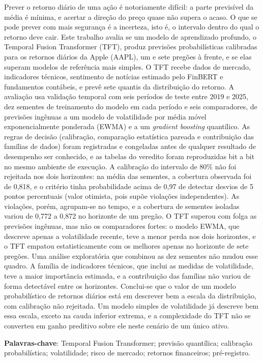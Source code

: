 \begin{resumo}

Prever o retorno diário de uma ação é notoriamente difícil: a parte previsível da média é mínima, e acertar a direção do preço quase não supera o acaso. O que se pode prever com mais segurança é a incerteza, isto é, o intervalo dentro do qual o retorno deve cair. Este trabalho avalia se um modelo de aprendizado profundo, o Temporal Fusion Transformer (TFT), produz previsões probabilísticas calibradas para os retornos diários da Apple (AAPL), um e sete pregões à frente, e se elas superam modelos de referência mais simples. O TFT recebe dados de mercado, indicadores técnicos, sentimento de notícias estimado pelo FinBERT e fundamentos contábeis, e prevê sete quantis da distribuição do retorno. A avaliação usa validação temporal com seis períodos de teste entre 2019 e 2025, dez sementes de treinamento do modelo em cada período e seis comparadores, de previsões ingênuas a um modelo de volatilidade por média móvel exponencialmente ponderada (EWMA) e a um \textit{gradient boosting} quantílico. As regras de decisão (calibração, comparação estatística pareada e contribuição das famílias de dados) foram registradas e congeladas antes de qualquer resultado de desempenho ser conhecido, e as tabelas do veredito foram reproduzidas bit a bit no mesmo ambiente de execução. A calibração do intervalo de 80\% não foi rejeitada nos dois horizontes: na média das sementes, a cobertura observada foi de 0,818, e o critério tinha probabilidade acima de 0,97 de detectar desvios de 5 pontos percentuais (valor otimista, pois supõe violações independentes). As violações, porém, agrupam-se no tempo, e a cobertura de sementes isoladas variou de 0,772 a 0,872 no horizonte de um pregão. O TFT superou com folga as previsões ingênuas, mas não os comparadores fortes: o modelo EWMA, que descreve apenas a volatilidade recente, teve a menor perda nos dois horizontes, e o TFT empatou estatisticamente com os melhores apenas no horizonte de sete pregões. Uma análise exploratória que combinou as dez sementes não mudou esse quadro. A família de indicadores técnicos, que inclui as medidas de volatilidade, teve a maior importância estimada, e a contribuição das famílias não variou de forma detectável entre os horizontes. Conclui-se que o valor de um modelo probabilístico de retornos diários está em descrever bem a escala da distribuição, com calibração não rejeitada. Um modelo simples de volatilidade já descreve bem essa escala, exceto na cauda inferior extrema, e a complexidade do TFT não se converteu em ganho preditivo sobre ele neste cenário de um único ativo.

\textbf{Palavras-chave}: Temporal Fusion Transformer; previsão quantílica; calibração probabilística; volatilidade; risco de mercado; retornos financeiros; pré-registro.

\end{resumo}
